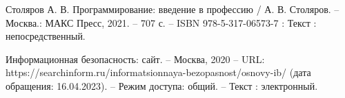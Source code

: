 

\begin{thebibliography}{0}

   Столяров А. В. Программирование: введение в
  профессию / А. В. Столяров. -- Москва.: МАКС Пресс, 2021. -- 707 с. -- ISBN
  978-5-317-06573-7 : Текст : непосредственный. 

   Информационная безопасность: сайт. -- Москва, 2020 -- URL:
  https://searchinform.ru/informatsionnaya-bezopasnost/osnovy-ib/ (дата
  обращения: 16.04.2023). -- Режим доступа: общий. -- Текст : электронный.






\end{thebibliography}
